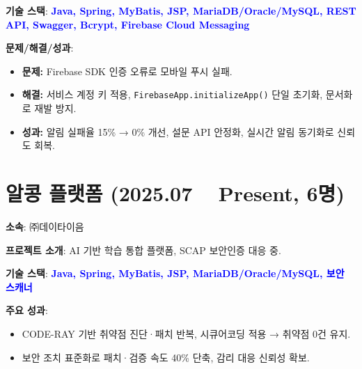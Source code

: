 \documentclass[a4paper,11pt]{article}
\newcommand{\tech}[1]{\textbf{\textcolor{blue}{#1}}}
\begin{document}
\textbf{기술 스택}: \tech{Java, Spring, MyBatis, JSP, MariaDB/Oracle/MySQL, REST API, Swagger, Bcrypt, Firebase Cloud Messaging}  

\textbf{문제/해결/성과}:
\begin{itemize}[leftmargin=*]
  \item \textbf{문제:} Firebase SDK 인증 오류로 모바일 푸시 실패.
  \item \textbf{해결:} 서비스 계정 키 적용, \texttt{FirebaseApp.initializeApp()} 단일 초기화, 문서화로 재발 방지.
  \item \textbf{성과:} 알림 실패율 15\% → 0\% 개선, 설문 API 안정화, 실시간 알림 동기화로 신뢰도 회복.
\end{itemize}

\section{알콩 플랫폼 (2025.07 ~ Present, 6명)}

\textbf{소속}: ㈜데이타이음  

\textbf{프로젝트 소개}:  
AI 기반 학습 통합 플랫폼, SCAP 보안인증 대응 중.  

\textbf{기술 스택}: \tech{Java, Spring, MyBatis, JSP, MariaDB/Oracle/MySQL, 보안 스캐너}  

\textbf{주요 성과}:
\begin{itemize}[leftmargin=*]
  \item CODE-RAY 기반 취약점 진단·패치 반복, 시큐어코딩 적용 → 취약점 0건 유지.
  \item 보안 조치 표준화로 패치·검증 속도 40\% 단축, 감리 대응 신뢰성 확보.
\end{itemize}
\end{document}
